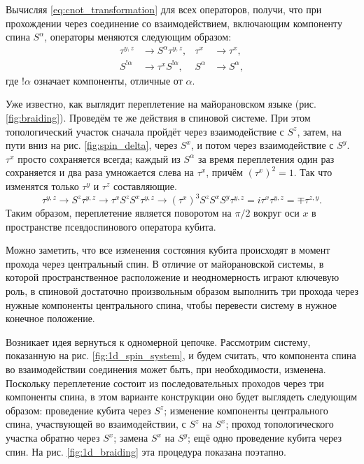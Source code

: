 \documentclass[a4paper,12pt]{article}
\theoremstyle{plain} %
\theoremstyle{definition} %
\theoremstyle{remark} %
\begin{document}
Вычисляя \ref{eq:cnot_transformation} для всех операторов, получи, что при прохождении через соединение со взаимодействием, включающим компоненту спина $S^\alpha$, операторы меняются следующим образом:
\begin{align}
    \tau^{y,z} &\rightarrow S^\alpha \tau^{y,z}, & \tau^x &\rightarrow \tau^x, \\
    S^{!\alpha} &\rightarrow \tau^x S^{!\alpha}, & S^\alpha &\rightarrow S^\alpha,
    \label{eq:spin_transformation}
\end{align}
где $!\alpha$ означает компоненты, отличные от $\alpha$.

Уже известно, как выглядит переплетение на майорановском языке (рис. \ref{fig:braiding}). Проведём те же действия в спиновой системе. При этом топологический участок сначала пройдёт через взаимодействие с $S^z$, затем, на пути вниз на рис. \ref{fig:spin_delta}, через $S^x$, и потом через взаимодействие с $S^y$. $\tau^x$ просто сохраняется всегда; каждый из $S^\alpha$ за время переплетения один раз сохраняется и два раза умножается слева на $\tau^x$, причём $\left( \tau^x \right)^2 = 1$. Так что изменятся только $\tau^y$ и $\tau^z$ составляющие.
\begin{equation}
    \tau^{y,z} \rightarrow S^z \tau^{y,z} \rightarrow \tau^x S^z S^x \tau^{y,z} \rightarrow \left( \tau^x \right)^3 S^z S^x S^y \tau^{y,z} = i \tau^x \tau^{y,z} = \mp \tau^{z,y}.
\end{equation}
Таким образом, переплетение является поворотом на $\pi/2$ вокруг оси $x$ в пространстве псевдоспинового оператора кубита.

Можно заметить, что все изменения состояния кубита происходят в момент прохода через центральный спин. В отличие от майорановской системы, в которой пространственное расположение и неодномерность играют ключевую роль, в спиновой достаточно произвольным образом выполнить три прохода через нужные компоненты центрального спина, чтобы перевести систему в нужное конечное положение.

Возникает идея вернуться к одномерной цепочке. Рассмотрим систему, показанную на рис. \ref{fig:1d_spin_system}, и будем считать, что компонента спина во взаимодействии соединения может быть, при необходимости, изменена. Поскольку переплетение состоит из последовательных проходов через три компоненты спина, в этом варианте конструкции оно будет выглядеть следующим образом: проведение кубита через $S^z$; изменение компоненты центрального спина, участвующей во взаимодействии, с $S^z$ на $S^x$; проход топологического участка обратно через $S^x$; замена $S^x$ на $S^y$; ещё одно проведение кубита через спин. На рис. \ref{fig:1d_braiding} эта процедура показана поэтапно.
\end{document}
